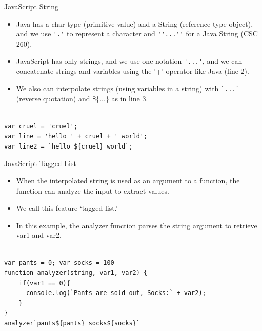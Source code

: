 

\begin{frame}[fragile]{JavaScript String}

\begin{itemize}
	\item Java has a char type (primitive value) and a String (reference type object), and we use \verb|'.'| to represent a character and \verb|''...''| for a Java String (CSC 260). 
	\item JavaScript has only strings, and we use one notation \verb|'...'|, and we can concatenate strings and variables using the '+' operator like Java (line 2). 
	\item We also can interpolate strings (using variables in a string) with \verb|`...`| (reverse quotation) and \$\{...\} as in line 3.
\end{itemize}

\begin{Code}{}%
\begin{lstlisting}[firstnumber=1, label=glabels, xleftmargin=0pt, basicstyle=\tiny]% 

var cruel = 'cruel';
var line = 'hello ' + cruel + ' world';
var line2 = `hello ${cruel} world`;
\end{lstlisting}%
\end{Code}%

\end{frame}

\begin{frame}[fragile]{JavaScript Tagged List}

\begin{itemize}
	\item When the interpolated string is used as an argument to a function, the function can analyze the input to extract values. 
	\item We call this feature `tagged list.'
	\item In this example, the analyzer function parses the string argument to retrieve var1 and var2. 
\end{itemize}

\begin{Code}{}%
\begin{lstlisting}[firstnumber=1, label=glabels, xleftmargin=0pt, basicstyle=\scriptsize]% 

var pants = 0; var socks = 100
function analyzer(string, var1, var2) {
    if(var1 == 0){
      console.log(`Pants are sold out, Socks:` + var2);
    }
}
analyzer`pants${pants} socks${socks}`
\end{lstlisting}%
\end{Code}%

\end{frame}

